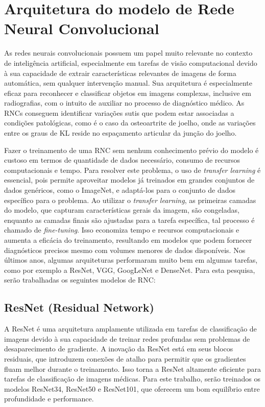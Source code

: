 \section{Arquitetura do modelo de Rede Neural Convolucional}

As redes neurais convolucionais possuem um papel muito relevante no contexto de inteligência artificial, especialmente em tarefas de visão computacional devido à sua capacidade de extrair características relevantes de imagens de forma automática, sem qualquer intervenção manual. Sua arquitetura é especialmente eficaz para reconhecer e classificar objetos em imagens complexas, inclusive em radiografias, com o intuito de auxiliar no processo de diagnóstico médico. As RNCs conseguem identificar variações sutis que podem estar associadas a condições patológicas, como é o caso da osteoartrite de joelho, onde as variações entre os graus de KL reside no espaçamento articular da junção do joelho.

Fazer o treinamento de uma RNC sem nenhum conhecimento prévio do modelo é custoso em termos de quantidade de dados necessário, consumo de recursos computacionais e tempo. Para resolver este problema, o uso de \textit{transfer learning} é essencial, pois permite aproveitar modelos já treinados em grandes conjuntos de dados genéricos, como o ImageNet, e adaptá-los para o conjunto de dados específico para o problema. Ao utilizar o \textit{transfer learning}, as primeiras camadas do modelo, que capturam características gerais da imagem, são congeladas, enquanto as camadas finais são ajustadas para a tarefa específica, tal processo é chamado de \textit{fine-tuning}. Isso economiza tempo e recursos computacionais e aumenta a eficácia do treinamento, resultando em modelos que podem fornecer diagnósticos precisos mesmo com volumes menores de dados disponíveis. Nos últimos anos, algumas arquiteturas performaram muito bem em algumas tarefas, como por exemplo a ResNet, VGG, GoogLeNet e DenseNet. Para esta pesquisa, serão trabalhadas os seguintes modelos de RNC:

\subsection{ResNet (Residual Network)}

A ResNet é uma arquitetura amplamente utilizada em tarefas de classificação de imagens devido à sua capacidade de treinar redes profundas sem problemas de desaparecimento de gradiente. A inovação da ResNet está em seus blocos residuais, que introduzem conexões de atalho para permitir que os gradientes fluam melhor durante o treinamento. Isso torna a ResNet altamente eficiente para tarefas de classificação de imagens médicas. Para este trabalho, serão treinados os modelos ResNet34, ResNet50 e ResNet101, que oferecem um bom equilíbrio entre profundidade e performance.

